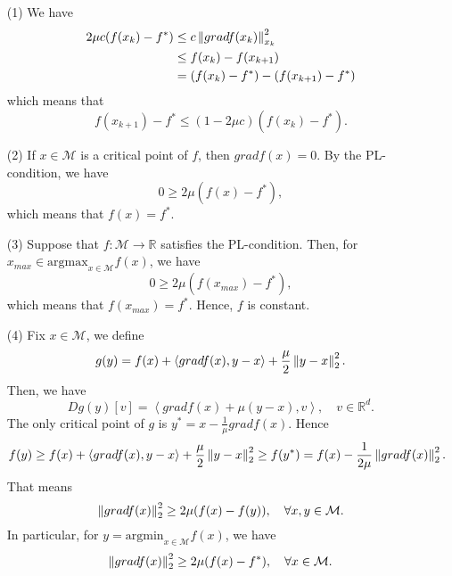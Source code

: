 \documentclass[en, oneside]{assignment}
\begin{document}
\begin{sol}
    \begin{itemize}
        \item[(1)] We have
        \begin{align*}
            2 \mu c (f(x_k) - f ^*) & \leq c \left\lVert gradf(x_k)\right\rVert _{x_k} ^2\\
            & \leq f(x_k) - f(x_{k+1})\\
            & = (f(x_k) - f ^*) - (f(x_{k+1}) - f ^*)\\
        \end{align*}
        which means that
        \begin{equation*}
            f(x_{k+1}) - f ^* \leq (1 - 2 \mu c) (f(x_k) - f ^*).
        \end{equation*}
        \item[(2)] If $x \in \mathcal{M}$ is a critical point of $f$, then $gradf(x) = 0$. By the PL-condition, we have
        \begin{equation*}
            0 \geq 2 \mu (f(x) - f ^*),
        \end{equation*}
        which means that $f(x) = f ^*$.
        \item[(3)] Suppose that $f: \mathcal{M} \to \mathbb{R}$ satisfies the PL-condition. 
        Then, for $x_{max} \in \text{argmax} _{x \in \mathcal{M}} f(x)$, we have
        \begin{equation*}
            0 \geq 2 \mu (f(x_{max}) - f ^*),
        \end{equation*}
        which means that $f(x_{max}) = f ^*$. Hence, $f$ is constant.
        \item[(4)] Fix $x \in \mathcal{M}$, we define 
        \begin{equation*}
            g(y) = f(x) + \left\langle gradf(x), y - x \right\rangle + \frac{\mu}{2} \left\lVert y - x\right\rVert _2 ^2.
        \end{equation*}
        Then, we have
        \begin{equation*}
            Dg(y)[v] = \left\langle gradf(x) + \mu (y - x), v \right\rangle, \quad v \in \mathbb{R} ^d.
        \end{equation*}
        The only critical point of $g$ is $y ^* = x - \frac{1}{\mu} gradf(x)$. Hence
        \begin{equation*}
            f(y) \geq f(x) + \left\langle gradf(x), y - x \right\rangle + \frac{\mu}{2} \left\lVert y - x\right\rVert _2 ^2 \geq 
            f(y ^*) = f(x) - \frac{1}{2 \mu} \left\lVert gradf(x)\right\rVert _2 ^2.
        \end{equation*}
        That means
        \begin{equation*}
            \left\lVert gradf(x)\right\rVert _2 ^2 \geq 2 \mu (f(x) - f(y)), \quad \forall x, y \in \mathcal{M}.
        \end{equation*}
        In particular, for $y = \text{argmin} _{x \in \mathcal{M}} f(x)$, we have
        \begin{equation*}
            \left\lVert gradf(x)\right\rVert _2 ^2 \geq 2 \mu (f(x) - f ^*), \quad \forall x \in \mathcal{M}.
        \end{equation*}
    \end{itemize}
\end{sol}
\end{document}
